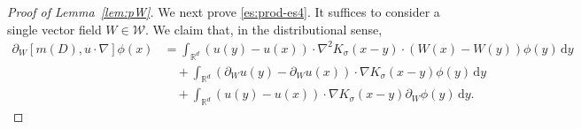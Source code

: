 \documentclass[reqno,11pt,a4paper]{amsart}
\newcommand{\R}{\ensuremath{\mathbb{R}}}
\newcommand{\dd}{\mathrm{d}}
\begin{document}
\begin{proof}[Proof of Lemma~\ref{lem:pW}]

We next prove \eqref{es:prod-es4}.
It suffices to consider a single vector field
$W\in\mathcal W$.
We claim that, in the distributional sense,
\begin{equation}\label{eq:pWcomm-u-phi}
\begin{aligned}
  \partial_W[m(D),u\cdot\nabla]\phi(x)
  &=
  \int_{\R^d}
  (u(y)-u(x))\cdot\nabla^2K_\sigma(x-y)
  \cdot(W(x)-W(y))\phi(y)\,\dd y
  \\
  &\quad+
  \int_{\R^d}
  (\partial_Wu(y)-\partial_Wu(x))
  \cdot\nabla K_\sigma(x-y)\phi(y)\,\dd y
  \\
  &\quad+
  \int_{\R^d}
  (u(y)-u(x))\cdot\nabla K_\sigma(x-y)
  \partial_W\phi(y)\,\dd y.
\end{aligned}
\end{equation}


\end{proof}
\end{document}
